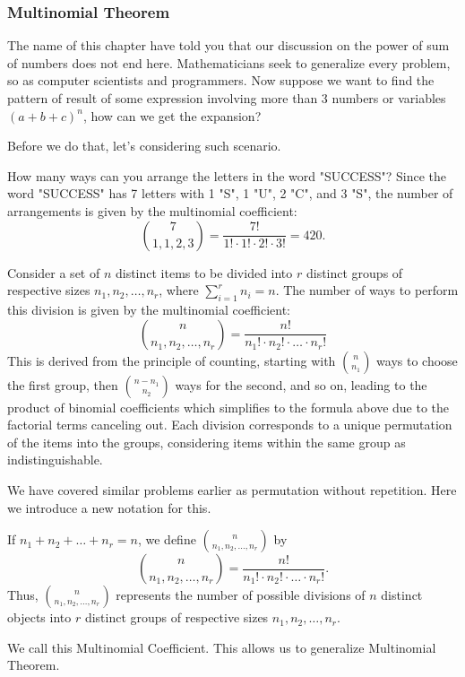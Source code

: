         \subsubsection*{Multinomial Theorem}
        The name of this chapter have told you that our discussion on the power of sum of numbers does not 
        end here. Mathematicians seek to generalize every problem, so as computer scientists and programmers. 
        Now suppose we want to find the pattern of result of some expression involving more than 3 numbers 
        or variables $(a+b+c)^n$, how can we get the expansion?

        Before we do that, let's considering such scenario. 
        \begin{example}
            How many ways can you arrange the letters in the word "SUCCESS"?
            Since the word "SUCCESS" has 7 letters with 1 "S", 1 "U", 2 "C", and 3 "S", the number of arrangements is given by the multinomial coefficient:
            \[
            \binom{7}{1,1,2,3} = \frac{7!}{1! \cdot 1! \cdot 2! \cdot 3!} = 420.
            \]
        \end{example}

        \begin{example}
            Consider a set of $n$ distinct items to be divided into $r$ distinct groups of respective sizes $n_1, n_2, \ldots, n_r$, where $\sum_{i=1}^{r} n_i = n$. The number of ways to perform this division is given by the multinomial coefficient:
            \[
            \binom{n}{n_1, n_2, \ldots, n_r} = \frac{n!}{n_1! \cdot n_2! \cdot \ldots \cdot n_r!}
            \]
            This is derived from the principle of counting, starting with $\binom{n}{n_1}$ ways to choose the first group, then $\binom{n - n_1}{n_2}$ ways for the second, and so on, leading to the product of binomial coefficients which simplifies to the formula above due to the factorial terms canceling out. Each division corresponds to a unique permutation of the items into the groups, considering items within the same group as indistinguishable.
        \end{example}
        We have covered similar problems earlier as permutation without repetition. Here we introduce a new
        notation for this.
        \begin{notation}
            If $n_1 + n_2 + \dots + n_r = n$, we define $\binom{n}{n_1, n_2, \ldots, n_r}$ by
            \[
            \binom{n}{n_1, n_2, \ldots, n_r} = \frac{n!}{n_1! \cdot n_2! \cdot \ldots \cdot n_r!}.
            \]
            Thus, $\binom{n}{n_1, n_2, \ldots, n_r}$ represents the number of possible divisions of $n$ distinct objects into $r$ distinct groups of respective sizes $n_1, n_2, \ldots, n_r$.
        \end{notation}
        We call this Multinomial Coefficient. This allows us to generalize Multinomial Theorem.

